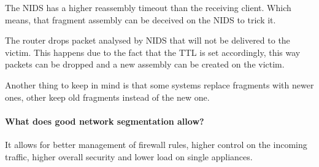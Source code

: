 The NIDS has a higher reassembly timeout than the receiving client. Which means, that fragment assembly can be deceived on the NIDS to trick it.

The router drops packet analysed by NIDS that will not be delivered to the victim. This happens due to the fact that the TTL is set accordingly, this way packets can be dropped and a new assembly can be created on the victim.

Another thing to keep in mind is that some systems replace fragments with newer ones, other keep old fragments instead of the new one.

\paragraph{What does good network segmentation allow?}
It allows for better management of firewall rules, higher control on the incoming traffic, higher overall security and lower load on single appliances. 